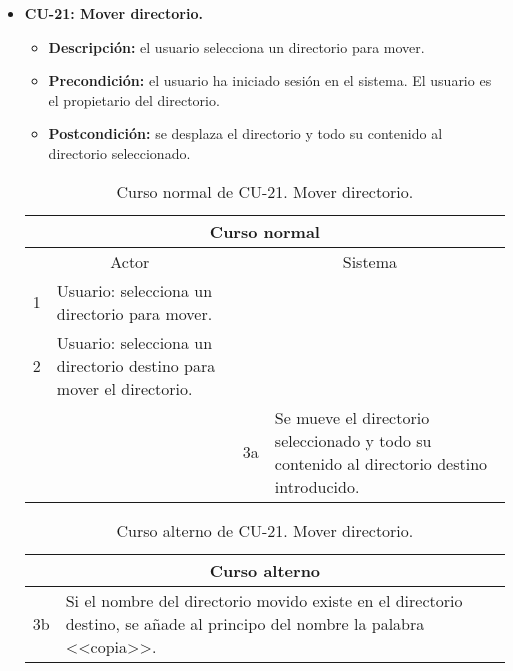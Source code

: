 \begin{itemize}
	\item \textbf{CU-21: Mover directorio.}
	\begin{itemize}
		\item \textbf{Descripción:} el usuario selecciona un directorio para mover.
		\item \textbf{Precondición:} el usuario ha iniciado sesión en el sistema. El usuario es el propietario del directorio.
		\item \textbf{Postcondición:} se desplaza el directorio y todo su contenido al directorio seleccionado.
	\end{itemize}
	\begin{table}[H]
		\centering
		\begin{tabular}{|p{0.3cm}|p{5cm}|p{0.3cm}|p{5cm}|}
			\hline
			\multicolumn{4}{|c|}{Curso normal} \\ \hline
			\multicolumn{2}{|c|}{Actor} & \multicolumn{2}{|c|}{Sistema} \\ \hline
			1 & Usuario: selecciona un directorio para mover. &  &  \\ \hline
			2 & Usuario: selecciona un directorio destino para mover el directorio. &  &  \\ \hline
			&  & 3a & Se mueve el directorio seleccionado y todo su contenido al directorio destino introducido. \\ \hline
		\end{tabular}
		\caption{Curso normal de CU-21. Mover directorio.}
		\label{tabla:cu21-normal}
	\end{table}
	
	\begin{table}[H]
		\centering
		\begin{tabular}{|p{0.3cm}|p{10cm}|}
			\hline
			\multicolumn{2}{|c|}{Curso alterno} \\ \hline
			3b & Si el nombre del directorio movido existe en el directorio destino, se añade al principo del nombre la palabra <<copia>>. \\ \hline
		\end{tabular}
		\caption{Curso alterno de CU-21. Mover directorio.}
		\label{tabla:cu21-alterno}
	\end{table}
\end{itemize}

